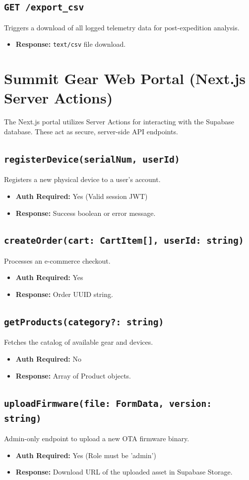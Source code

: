 \subsection{\texttt{GET /export\_csv}}
Triggers a download of all logged telemetry data for post-expedition analysis.
\begin{itemize}
    \item \textbf{Response:} \texttt{text/csv} file download.
\end{itemize}

\section{Summit Gear Web Portal (Next.js Server Actions)}

The Next.js portal utilizes Server Actions for interacting with the Supabase database. These act as secure, server-side API endpoints.

\subsection{\texttt{registerDevice(serialNum, userId)}}
Registers a new physical device to a user's account.
\begin{itemize}
    \item \textbf{Auth Required:} Yes (Valid session JWT)
    \item \textbf{Response:} Success boolean or error message.
\end{itemize}

\subsection{\texttt{createOrder(cart: CartItem[], userId: string)}}
Processes an e-commerce checkout.
\begin{itemize}
    \item \textbf{Auth Required:} Yes
    \item \textbf{Response:} Order UUID string.
\end{itemize}

\subsection{\texttt{getProducts(category?: string)}}
Fetches the catalog of available gear and devices.
\begin{itemize}
    \item \textbf{Auth Required:} No
    \item \textbf{Response:} Array of Product objects.
\end{itemize}

\subsection{\texttt{uploadFirmware(file: FormData, version: string)}}
Admin-only endpoint to upload a new OTA firmware binary.
\begin{itemize}
    \item \textbf{Auth Required:} Yes (Role must be 'admin')
    \item \textbf{Response:} Download URL of the uploaded asset in Supabase Storage.
\end{itemize}
